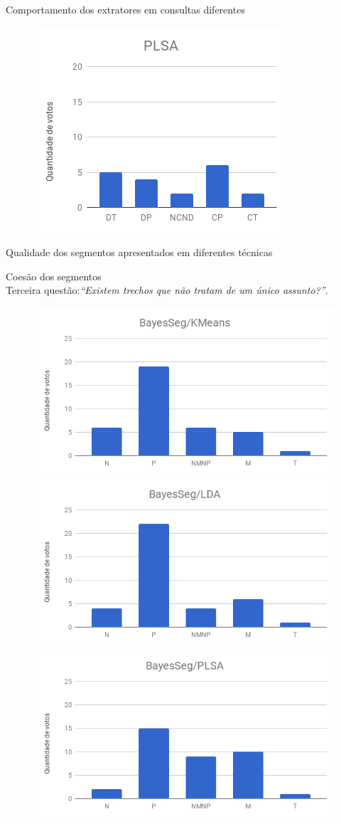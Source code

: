 \documentclass[xcolor=table]{beamer}
\begin{document}
\begin{frame}{Comportamento dos extratores em consultas diferentes}
\begin{figure}[!h]
		\includegraphics[width=.31\textwidth]{images/figuras-experimento/C2-Q2-PLSA.png}



\end{figure}

\end{frame}





\begin{frame}{Qualidade dos segmentos apresentados em diferentes técnicas}

\center Coesão dos segmentos\\
\tiny Terceira questão:\textit{``Existem trechos que não tratam de um único assunto?''}.%
	\vspace{1cm}

\begin{figure}[!h] \centering     %

		\includegraphics[width=.31\textwidth]{images/figuras-experimento/t1q3.png}
		\includegraphics[width=.31\textwidth]{images/figuras-experimento/t2q3.png}
		\includegraphics[width=.31\textwidth]{images/figuras-experimento/t3q3.png}


\end{figure}



\end{frame}
\end{document}
